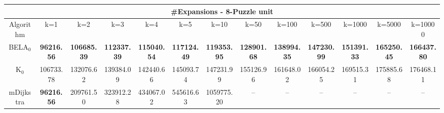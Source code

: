 \begin{tabular}{c|cccccccccccc}\toprule
\multicolumn{13}{c}{#Expansions - 8-Puzzle unit}\\ \midrule
Algorithm & k=1 & k=2 & k=3 & k=4 & k=5 & k=10 & k=50 & k=100 & k=500 & k=1000 & k=5000 & k=10000 \\ \midrule
BELA$_0$ & \textbf{96216.56} & \textbf{106685.39} & \textbf{112337.39} & \textbf{115040.54} & \textbf{117124.49} & \textbf{119353.95} & \textbf{128901.68} & \textbf{138994.35} & \textbf{147230.99} & \textbf{151391.33} & \textbf{165250.45} & \textbf{166437.80} \\
K$_0$ & 106733.78 & 132076.62 & 139384.09 & 142440.66 & 145093.74 & 147231.99 & 155126.96 & 161648.02 & 166054.25 & 169515.31 & 175885.68 & 176468.11 \\
mDijkstra & \textbf{96216.56} & 209761.50 & 323912.28 & 434067.02 & 545616.63 & 1059775.20 & -- & -- & -- & -- & -- & -- \\ \bottomrule 
\end{tabular}
